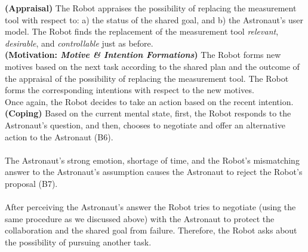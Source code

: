 \noindent\textbf{(Appraisal)} The Robot appraises the possibility of replacing
the measurement tool with respect to: a) the status of the shared goal, and b)
the Astronaut's user model. The Robot finds the replacement of the measurement
tool \textit{relevant}, \textit{desirable}, and \textit{controllable} just as
before.\\

\noindent\textbf{(Motivation: \textit{Motive \& Intention Formations})} The
Robot forms new motives based on the next task according to the shared plan and
the outcome of the appraisal of the possibility of replacing the measurement
tool. The Robot forms the corresponding intentions with respect to the new
motives.\\

\noindent Once again, the Robot decides to take an action based on the recent
intention.\\

\noindent\textbf{(Coping)} Based on the current mental state, first, the Robot
responds to the Astronaut's question, and then, chooses to negotiate and offer
an alternative action to the Astronaut (B6).\\

\noindent{}\\

The Astronaut's strong emotion, shortage of time, and the Robot's mismatching
answer to the Astronaut's assumption causes the Astronaut to reject the Robot's
proposal (B7).\\

\noindent{}\\

After perceiving the Astronaut's answer the Robot tries to negotiate (using the
same procedure as we discussed above) with the Astronaut to protect the
collaboration and the shared goal from failure. Therefore, the Robot asks about
the possibility of pursuing another task.\\

\noindent{}\\

